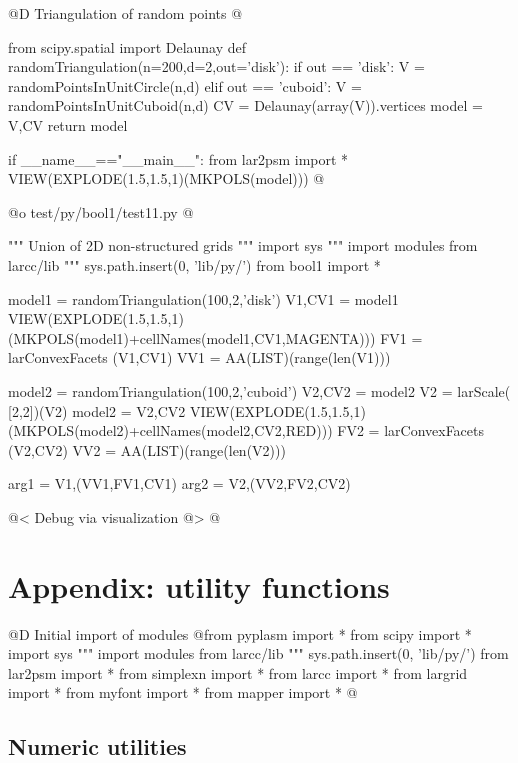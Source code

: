 \documentclass[11pt,oneside]{article}	%
\begin{document}
@D Triangulation of random points
@{from scipy.spatial import Delaunay
def randomTriangulation(n=200,d=2,out='disk'):
	if out == 'disk':
		V = randomPointsInUnitCircle(n,d)
	elif out == 'cuboid':
		V = randomPointsInUnitCuboid(n,d)
	CV = Delaunay(array(V)).vertices
	model = V,CV
	return model

if __name__=="__main__":
	from lar2psm import *
	VIEW(EXPLODE(1.5,1.5,1)(MKPOLS(model)))
@}



@o test/py/bool1/test11.py
@{""" Union of 2D non-structured grids """
import sys
""" import modules from larcc/lib """
sys.path.insert(0, 'lib/py/')
from bool1 import *

model1 = randomTriangulation(100,2,'disk')
V1,CV1 = model1
VIEW(EXPLODE(1.5,1.5,1)(MKPOLS(model1)+cellNames(model1,CV1,MAGENTA)))
FV1 = larConvexFacets (V1,CV1)
VV1 = AA(LIST)(range(len(V1)))

model2 = randomTriangulation(100,2,'cuboid')
V2,CV2 = model2
V2 = larScale( [2,2])(V2)
model2 = V2,CV2 
VIEW(EXPLODE(1.5,1.5,1)(MKPOLS(model2)+cellNames(model2,CV2,RED)))
FV2 = larConvexFacets (V2,CV2)
VV2 = AA(LIST)(range(len(V2)))

arg1 = V1,(VV1,FV1,CV1)
arg2 = V2,(VV2,FV2,CV2)

@< Debug via visualization @>
@}


\appendix
\section{Appendix: utility functions}
@D Initial import of modules
@{from pyplasm import *
from scipy import *
import sys
""" import modules from larcc/lib """
sys.path.insert(0, 'lib/py/')
from lar2psm import *
from simplexn import *
from larcc import *
from largrid import *
from myfont import *
from mapper import *
@}
\subsection{Numeric utilities}
\end{document}
